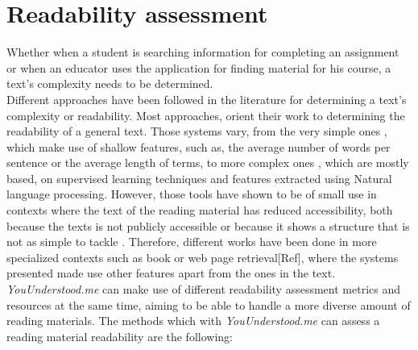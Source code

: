 \documentclass{sig-alternate-05-2015}
\begin{document}
 

\section{Readability assessment}
Whether when a student is searching information for completing an assignment or when an educator uses the application for finding material for his course, a text's complexity needs to be determined.\\




Different approaches have been followed in the literature for determining a text's complexity or readability. Most approaches, orient their work to determining the readability of a general text. Those systems vary, from the very simple ones \cite{flesch1948new}, which make use of shallow features, such as, the average number of words per sentence or the average length of terms, to more complex ones \cite{gonzalez2014simple }\cite{dell2011read} \cite{franccois2012ai}, which are mostly based, on supervised learning techniques and features extracted using Natural language processing. However, those tools have shown to be of small use in contexts where the text of the reading material has reduced accessibility, both because the texts is not publicly accessible or because it shows a structure that is not as simple to tackle . Therefore, different works have been done in more specialized contexts such as book\cite{denning2015readability}\cite{pera2014automating} or web page retrieval[Ref], where the systems presented made use other features apart from the ones in the text.\\


\textit{YouUnderstood.me} can make use of different readability assessment metrics and resources at the same time, aiming to be able to handle a more diverse amount of reading materials. The methods  which with \textit{YouUnderstood.me} can assess a reading material readability are the following:
\end{document}
